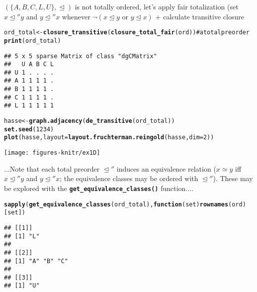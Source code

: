 \documentclass[11pt]{article}\usepackage{graphicx, color}
\makeatletter
\newcommand{\hlfunctioncall}[1]{\textcolor[rgb]{0.501960784313725,0,0.329411764705882}{\textbf{#1}}}%
\newcommand{\hlcomment}[1]{\textcolor[rgb]{0.180392156862745,0.6,0.341176470588235}{#1}}%
\newenvironment{kframe}{%
 \def\at@end@of@kframe{}%
 \ifinner\ifhmode%
  \def\at@end@of@kframe{\end{minipage}}%
  \begin{minipage}{\columnwidth}%
 \fi\fi%
 \def\FrameCommand##1{\hskip\@totalleftmargin \hskip-\fboxsep
 \colorbox{shadecolor}{##1}\hskip-\fboxsep
     \hskip-\linewidth \hskip-\@totalleftmargin \hskip\columnwidth}%
 \MakeFramed {\advance\hsize-\width
   \@totalleftmargin\z@ \linewidth\hsize
   \@setminipage}}%
 {\par\unskip\endMakeFramed%
 \at@end@of@kframe}
\newenvironment{knitrout}{}{} %
\newcommand{\Rfunc}[1]{\texttt{\hlfunctioncall{#1}}}
\theoremstyle{remark}
\theoremstyle{definition}
\makeatother
\begin{document}
$(\{A, B, C, L, U\}, \trianglelefteq)$ is not totally ordered,
let's apply fair totalization (set $x\trianglelefteq'' y$
and $y\trianglelefteq'' x$ whenever $\neg (x\trianglelefteq y\text{ or }
y\trianglelefteq x)$ + calculate transitive closure


\begin{knitrout}\small
{}\color{fgcolor}\begin{kframe}
\begin{alltt}
ord_total <- \hlfunctioncall{closure_transitive}(\hlfunctioncall{closure_total_fair}(ord)) \hlcomment{# a total preorder}
\hlfunctioncall{print}(ord_total)
\end{alltt}
\begin{verbatim}
## 5 x 5 sparse Matrix of class "dgCMatrix"
##   U A B C L
## U 1 . . . .
## A 1 1 1 1 .
## B 1 1 1 1 .
## C 1 1 1 1 .
## L 1 1 1 1 1
\end{verbatim}
\begin{alltt}
hasse <- \hlfunctioncall{graph.adjacency}(\hlfunctioncall{de_transitive}(ord_total))
\hlfunctioncall{set.seed}(1234)
\hlfunctioncall{plot}(hasse, layout=\hlfunctioncall{layout.fruchterman.reingold}(hasse, dim=2))
\end{alltt}
\end{kframe}

{\centering \texttt{[image: figures-knitr/ex1D]} 

}



\end{knitrout}


...Note that each total preorder $\trianglelefteq''$ induces an
equivalence relation ($x\simeq y$ iff $x\trianglelefteq''y$ and $y\trianglelefteq''x$;
the equivalence classes may be ordered with $\trianglelefteq''$).
These may be explored with the \Rfunc{get\_equivalence\_classes()}
function....

\begin{knitrout}\small
{}\color{fgcolor}\begin{kframe}
\begin{alltt}
\hlfunctioncall{sapply}(\hlfunctioncall{get_equivalence_classes}(ord_total), \hlfunctioncall{function}(set) \hlfunctioncall{rownames}(ord)[set])
\end{alltt}
\begin{verbatim}
## [[1]]
## [1] "L"
## 
## [[2]]
## [1] "A" "B" "C"
## 
## [[3]]
## [1] "U"
\end{verbatim}
\end{kframe}
\end{knitrout}
\end{document}
